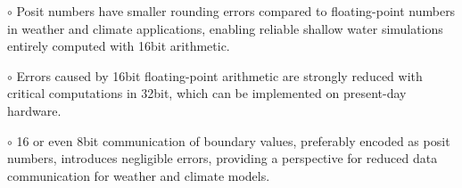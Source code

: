 \documentclass[draft]{agujournal2019}
\begin{document}





\begin{keypoints}
\item $\circ$ Posit numbers have smaller rounding errors compared to floating-point numbers in weather and climate applications, enabling reliable shallow water simulations entirely computed with 16bit arithmetic.

\item $\circ$ Errors caused by 16bit floating-point arithmetic are strongly reduced with critical computations in 32bit, which can be implemented on present-day hardware.

\item $\circ$ 16 or even 8bit communication of boundary values, preferably encoded as posit numbers, introduces negligible errors, providing a perspective for reduced data communication for weather and climate models.

\end{keypoints}

%
%

%
%
\end{document}
